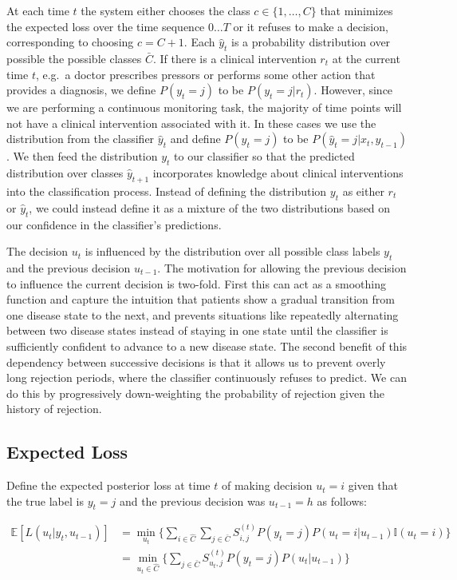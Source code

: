 \documentclass[12pt,solutions]{article}
\newcommand{\yh}{\hat{y}}
\newcommand{\I}{\mathbb{I}}
\newcommand{\E}{\mathbb{E}}
\begin{document}
At each time $t$ the system either chooses the class $c \in \{1,\ldots, C\}$ that minimizes the expected loss over the time sequence $0\ldots T$ or it refuses to make a decision, corresponding to choosing $c = C+1$. Each $\yh_t$ is a probability distribution over possible the possible classes $\bar{C}$. If there is a clinical intervention $r_t$ at the current time $t$, e.g.\ a doctor prescribes pressors or performs some other action that provides a diagnosis, we define $P(y_t=j)$ to be $P(y_t=j|r_t)$. However, since we are performing a continuous monitoring task, the majority of time points will not have a clinical intervention associated with it. In these cases we use the distribution from the classifier $\yh_t$ and define $P(y_t=j)$ to be $P(\yh_t=j|x_t, y_{t-1})$. We then feed the distribution $y_t$ to our classifier so that the predicted distribution over classes $\yh_{t+1}$ incorporates knowledge about clinical interventions into the classification process. Instead of defining the distribution $y_t$ as either $r_t$ or $\yh_t$, we could instead define it as a mixture of the two distributions based on our confidence in the classifier's predictions. 

The decision $u_t$ is influenced by the distribution over all possible class labels $y_t$ and the previous decision $u_{t-1}$. The motivation for allowing the previous decision to influence the current decision is two-fold. First this can act as a smoothing function and capture the intuition that patients show a gradual transition from one disease state to the next, and prevents situations like repeatedly alternating between two disease states instead of staying in one state until the classifier is sufficiently confident to advance to a new disease state. The second benefit of this dependency between successive decisions is that it allows us to prevent overly long rejection periods, where the classifier continuously refuses to predict. We can do this by progressively down-weighting the probability of rejection given the history of rejection.

\subsection{Expected Loss}
Define the expected posterior loss at time $t$ of making decision $u_t=i$ given that the true label is $y_t=j$ and the previous decision was $u_{t-1}=h$ as follows:

\begin{align}
\E[L(u_t|y_t, u_{t-1})] &= \min_{u_t} \Big\{ \sum_{i \in \hat{C}} \sum_{j \in \bar{C}} S_{i,j}^{(t)} P(y_t=j)P(u_t=i|u_{t-1})\I(u_t=i)\Big\}\\
&= \min_{u_t \in \hat{C}} \Big\{ \sum_{j \in \bar{C}} S_{u_t,j}^{(t)} P(y_t=j)P(u_t|u_{t-1})\Big\}
\label{eqn:exploss}
\end{align}
\end{document}
